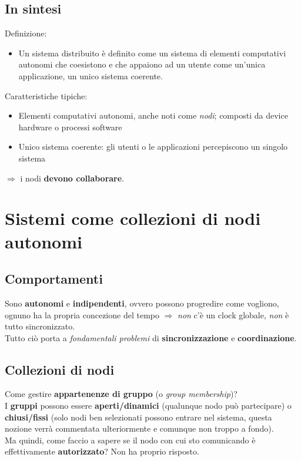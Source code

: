 \subsection{In sintesi}
Definizione:
\begin{itemize}
    \item Un sistema distribuito è definito come un sistema di elementi computativi autonomi che coesistono e che appaiono ad un utente come un'unica applicazione, un unico sistema coerente.
\end{itemize}
Caratteristiche tipiche:
\begin{itemize}
   \item Elementi computativi autonomi, anche noti come \textit{nodi}; composti da device hardware o processi software
   \item Unico sistema coerente: gli utenti o le applicazioni percepiscono un singolo sistema
\end{itemize}
$\Rightarrow$ i nodi \textbf{devono collaborare}.

\section{Sistemi come collezioni di nodi autonomi}
\subsection{Comportamenti}
Sono \textbf{autonomi} e \textbf{indipendenti}, ovvero possono progredire come vogliono, ognuno ha la propria concezione del tempo $\Rightarrow$ \textit{non} c'è un clock globale, \textit{non} è tutto sincronizzato.
\\Tutto ciò porta a \textit{fondamentali problemi} di \textbf{sincronizzazione} e \textbf{coordinazione}.

\subsection{Collezioni di nodi}
Come gestire \textbf{appartenenze di gruppo} (o \textit{group membership})?
\\I \textbf{gruppi} possono essere \textbf{aperti/dinamici} (qualunque nodo può partecipare) o \textbf{chiusi/fissi} (solo nodi ben selezionati possono entrare nel sistema, questa nozione verrà commentata ulteriormente e comunque non troppo a fondo).
\\Ma quindi, come faccio a sapere se il nodo con cui sto comunicando è effettivamente \textbf{autorizzato}? Non ha proprio risposto.

